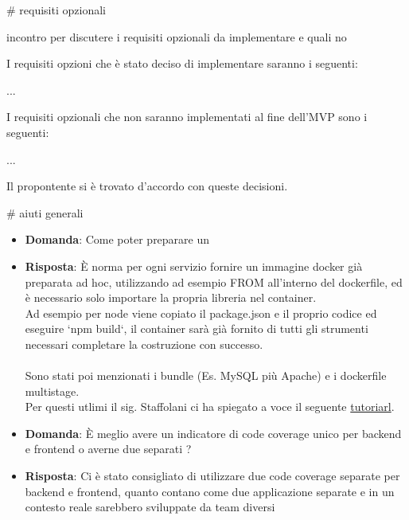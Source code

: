 
# requisiti opzionali

incontro per discutere i requisiti opzionali da implementare e quali no

I requisiti opzioni che è stato deciso di implementare saranno i seguenti:

...

I requisiti opzionali che non saranno implementati al fine dell'MVP sono i seguenti:

...

Il propontente si è trovato d'accordo con queste decisioni.


# aiuti generali

\begin{itemize}
\item \textbf{Domanda}: Come poter preparare un 
\item \textbf{Risposta}: È norma per ogni servizio fornire un immagine docker già preparata ad hoc, utilizzando ad esempio FROM all'interno del dockerfile, ed è necessario solo importare la propria libreria nel container. \\ Ad esempio per node viene copiato il package.json e il proprio codice ed eseguire `npm build`, il container sarà già fornito di tutti gli strumenti necessari completare la costruzione con successo. \\ \\ Sono stati poi menzionati i bundle (Es. MySQL più Apache) e i dockerfile multistage. \\ Per questi utlimi il sig. Staffolani ci ha spiegato a voce il seguente \href{https://medium.com/@mohamedbenkhemiswork576/how-to-dockerize-a-react-app-with-multi-stage-build-and-nginx-minimize-react-image-size-by-80-33a09ae20118}{tutoriarl}.
\end{itemize}

\begin{itemize}
\item \textbf{Domanda}: È meglio avere un indicatore di code coverage unico per backend e frontend o averne due separati ?
\item \textbf{Risposta}: Ci è stato consigliato di utilizzare due code coverage separate per backend e frontend, quanto contano come due applicazione separate e in un contesto reale sarebbero sviluppate da team diversi
\end{itemize}
